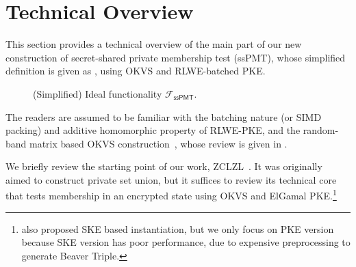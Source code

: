 \section{Technical Overview}\label{sec:tech_overview}
This section provides a technical overview of the main part of our new construction of secret-shared private membership test (ssPMT), whose simplified definition is given as , using OKVS and RLWE-batched PKE.

\begin{figure}[htbp]
\centering
{}
\caption{(Simplified) Ideal functionality $\mathcal{F}_{\mathsf{ssPMT}}$.}
\label{fig:F-sspmt-informal}
\end{figure}

The readers are assumed to be familiar with the batching nature (or SIMD packing) and additive homomorphic property of RLWE-PKE, and the random-band matrix based OKVS construction~\cite{BPSY23}, whose review is given in .

We briefly review the starting point of our work, ZCLZL~\cite{ZCL+23}. It was originally aimed to construct private set union, but it suffices to review its technical core that tests membership in an encrypted state using OKVS and ElGamal PKE.\footnote{\cite{ZCL+23} also proposed SKE based instantiation, but we only focus on PKE version because SKE version has poor performance, due to expensive preprocessing to generate Beaver Triple.}

